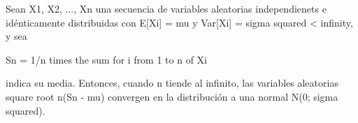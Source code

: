 \documentclass{article}
\begin{document}

Sean X1, X2, ..., Xn una secuencia de variables aleatorias
independienets e idénticamente distribuidas con
E[Xi] = mu y Var[Xi] = sigma squared < infinity,  y sea

Sn = 1/n times the sum for i from 1 to n of Xi

indica su media. Entonces, cuando n tiende al infinito, las
variables aleatorias square root n(Sn - mu) convergen en la
distribución a una normal N(0; sigma squared).
\end{document}
